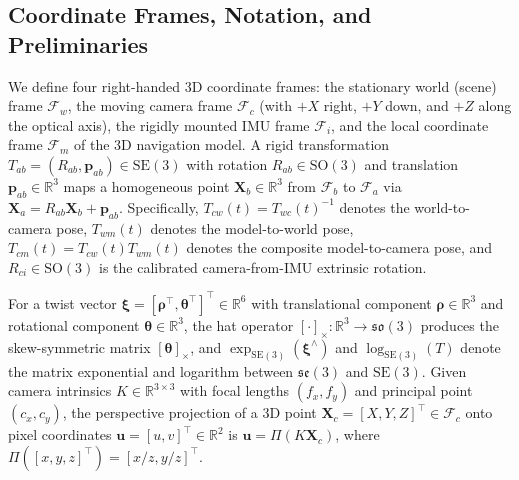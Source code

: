 \documentclass[journal]{IEEEtran}
\begin{document}
\subsection{Coordinate Frames, Notation, and Preliminaries}
We define four right-handed 3D coordinate frames: the stationary world (scene) frame $\mathcal{F}_w$, the moving camera frame $\mathcal{F}_c$ (with $+X$ right, $+Y$ down, and $+Z$ along the optical axis), the rigidly mounted IMU frame $\mathcal{F}_i$, and the local coordinate frame $\mathcal{F}_m$ of the 3D navigation model. A rigid transformation $T_{ab} = (R_{ab}, \mathbf{p}_{ab}) \in \mathrm{SE}(3)$ with rotation $R_{ab} \in \mathrm{SO}(3)$ and translation $\mathbf{p}_{ab} \in \mathbb{R}^3$ maps a homogeneous point $\mathbf{X}_b \in \mathbb{R}^3$ from $\mathcal{F}_b$ to $\mathcal{F}_a$ via $\mathbf{X}_a = R_{ab}\mathbf{X}_b + \mathbf{p}_{ab}$. Specifically, $T_{cw}(t) = T_{wc}(t)^{-1}$ denotes the world-to-camera pose, $T_{wm}(t)$ denotes the model-to-world pose, $T_{cm}(t) = T_{cw}(t)T_{wm}(t)$ denotes the composite model-to-camera pose, and $R_{ci} \in \mathrm{SO}(3)$ is the calibrated camera-from-IMU extrinsic rotation.

For a twist vector $\boldsymbol{\xi} = [\boldsymbol{\rho}^\top, \boldsymbol{\theta}^\top]^\top \in \mathbb{R}^6$ with translational component $\boldsymbol{\rho} \in \mathbb{R}^3$ and rotational component $\boldsymbol{\theta} \in \mathbb{R}^3$, the hat operator $[\cdot]_\times : \mathbb{R}^3 \rightarrow \mathfrak{so}(3)$ produces the skew-symmetric matrix $[\boldsymbol{\theta}]_\times$, and $\exp_{\mathrm{SE}(3)}(\boldsymbol{\xi}^\wedge)$ and $\log_{\mathrm{SE}(3)}(T)$ denote the matrix exponential and logarithm between $\mathfrak{se}(3)$ and $\mathrm{SE}(3)$. Given camera intrinsics $K \in \mathbb{R}^{3\times 3}$ with focal lengths $(f_x, f_y)$ and principal point $(c_x, c_y)$, the perspective projection of a 3D point $\mathbf{X}_c = [X, Y, Z]^\top \in \mathcal{F}_c$ onto pixel coordinates $\mathbf{u} = [u, v]^\top \in \mathbb{R}^2$ is $\mathbf{u} = \Pi(K\mathbf{X}_c)$, where $\Pi([x, y, z]^\top) = [x/z, y/z]^\top$.
\end{document}
